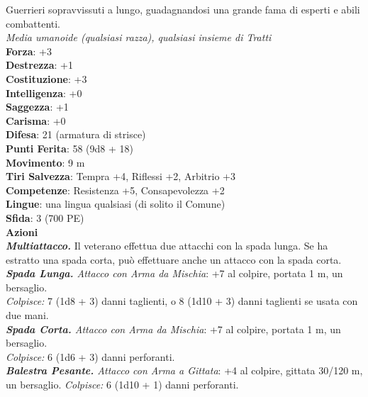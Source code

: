 \begin{multicols}{2}
Guerrieri sopravvissuti a lungo, guadagnandosi una grande fama di esperti e abili combattenti.\\
\emph{Media umanoide (qualsiasi razza), qualsiasi insieme di Tratti}\\
\textbf{Forza}: +3\\
\textbf{Destrezza}: +1\\
\textbf{Costituzione}: +3\\
\textbf{Intelligenza}: +0\\
\textbf{Saggezza}: +1\\
\textbf{Carisma}: +0\\
\textbf{Difesa}: 21 (armatura di strisce)\\
\textbf{Punti Ferita}: 58 (9d8 + 18)\\
\textbf{Movimento}: 9 m\\
\textbf{Tiri Salvezza}: Tempra +4, Riflessi +2, Arbitrio +3 \\
\textbf{Competenze}: Resistenza +5, Consapevolezza +2\\
\textbf{Lingue}: una lingua qualsiasi (di solito il Comune)\\
\textbf{Sfida}: 3 (700 PE)\smallskip\\
\smallskip\textbf{Azioni}\\
\emph{\textbf{Multiattacco.}} Il veterano effettua due attacchi con la spada lunga. Se ha estratto una spada corta, può effettuare anche un attacco con la spada corta.
\emph{\textbf{Spada Lunga.} Attacco con Arma da Mischia}: +7 al colpire, portata 1 m, un bersaglio.\\
\emph{Colpisce:} 7 (1d8 + 3) danni taglienti, o 8 (1d10 + 3) danni taglienti se usata con due mani.\\
\emph{\textbf{Spada Corta.} Attacco con Arma da Mischia}: +7 al colpire, portata 1 m, un bersaglio.\\
\emph{Colpisce:} 6 (1d6 + 3) danni perforanti.\\
\emph{\textbf{Balestra Pesante.} Attacco con Arma a Gittata}: +4 al colpire, gittata 30/120 m, un bersaglio. \emph{Colpisce:} 6 (1d10 + 1) danni perforanti.\\


\end{multicols}
